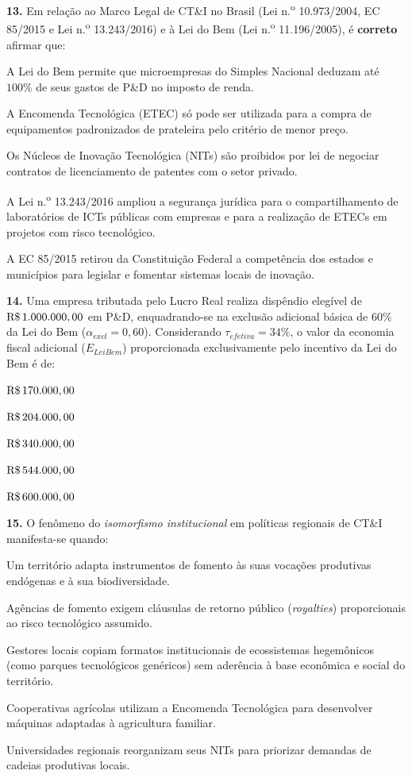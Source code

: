 \textbf{13.} Em relação ao Marco Legal de CT\&I no Brasil (Lei n.\textsuperscript{o} 10.973/2004, EC 85/2015 e Lei n.\textsuperscript{o} 13.243/2016) e à Lei do Bem (Lei n.\textsuperscript{o} 11.196/2005), é \textbf{correto} afirmar que:
\begin{alternativas}
  \item A Lei do Bem permite que microempresas do Simples Nacional deduzam até $100\%$ de seus gastos de P\&D no imposto de renda.
  \item A Encomenda Tecnológica (ETEC) só pode ser utilizada para a compra de equipamentos padronizados de prateleira pelo critério de menor preço.
  \item Os Núcleos de Inovação Tecnológica (NITs) são proibidos por lei de negociar contratos de licenciamento de patentes com o setor privado.
  \item A Lei n.\textsuperscript{o} 13.243/2016 ampliou a segurança jurídica para o compartilhamento de laboratórios de ICTs públicas com empresas e para a realização de ETECs em projetos com risco tecnológico.
  \item A EC 85/2015 retirou da Constituição Federal a competência dos estados e municípios para legislar e fomentar sistemas locais de inovação.
\end{alternativas}

\textbf{14.} Uma empresa tributada pelo Lucro Real realiza dispêndio elegível de $\text{R\$\,}{1.000.000,00}$ em P\&D, enquadrando-se na exclusão adicional básica de $60\%$ da Lei do Bem ($\alpha_{excl} = 0{,}60$). Considerando $\tau_{efetiva} = 34\%$, o valor da economia fiscal adicional ($E_{LeiBem}$) proporcionada exclusivamente pelo incentivo da Lei do Bem é de:
\begin{alternativas}
  \item $\text{R\$\,}{170.000,00}$
  \item $\text{R\$\,}{204.000,00}$
  \item $\text{R\$\,}{340.000,00}$
  \item $\text{R\$\,}{544.000,00}$
  \item $\text{R\$\,}{600.000,00}$
\end{alternativas}

\textbf{15.} O fenômeno do \textit{isomorfismo institucional} em políticas regionais de CT\&I manifesta-se quando:
\begin{alternativas}
  \item Um território adapta instrumentos de fomento às suas vocações produtivas endógenas e à sua biodiversidade.
  \item Agências de fomento exigem cláusulas de retorno público (\textit{royalties}) proporcionais ao risco tecnológico assumido.
  \item Gestores locais copiam formatos institucionais de ecossistemas hegemônicos (como parques tecnológicos genéricos) sem aderência à base econômica e social do território.
  \item Cooperativas agrícolas utilizam a Encomenda Tecnológica para desenvolver máquinas adaptadas à agricultura familiar.
  \item Universidades regionais reorganizam seus NITs para priorizar demandas de cadeias produtivas locais.
\end{alternativas}

